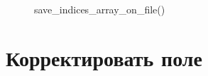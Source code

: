 \documentclass[12pt, a4paper]{article}
\begin{document}
\begin{figure}[H]
    \caption{save\_indices\_array\_on\_file()}
\end{figure}


\newpage
\section{Корректировать поле}

\end{document}

